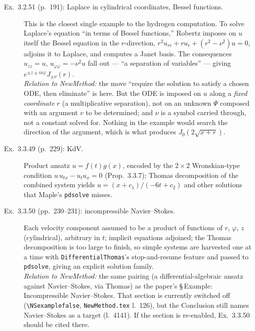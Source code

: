 \documentclass[11pt]{article}
\newcommand{\code}[1]{\texttt{#1}}
\begin{document}
\begin{description}
\item[Ex.~3.2.51 (p.~191): Laplace in cylindrical coordinates, Bessel
  functions.] This is the closest single example to the hydrogen
  computation. To solve Laplace's equation ``in terms of Bessel functions,''
  Robertz imposes on $u$ itself the Bessel equation in the $r$-direction,
  $r^2u_{rr} + r u_r + (r^2-\nu^2)u = 0$, adjoins it to Laplace, and computes a
  Janet basis. The consequences $u_{zz}=u$, $u_{\varphi\varphi}=-\nu^2u$ fall
  out --- ``a separation of variables'' --- giving $e^{\pm z \pm i\nu\varphi}
  J_{\pm\nu}(r)$. \\
  \emph{Relation to NewMethod:} the move ``require the solution to satisfy a
  chosen ODE, then eliminate'' is here. But the ODE is imposed on $u$ along a
  \emph{fixed coordinate} $r$ (a multiplicative separation), not on an
  unknown $\Psi$ composed with an argument $v$ to be determined; and $\nu$ is
  a symbol carried through, not a constant solved for. Nothing in the example
  would search the direction of the argument, which is what produces
  $J_0(2\sqrt{x+r})$.

\item[Ex.~3.3.49 (p.~229): KdV.] Product ansatz $u=f(t)g(x)$, encoded by the
  $2\times2$ Wronskian-type condition $u\,u_{tx}-u_t u_x=0$ (Prop.~3.3.7);
  Thomas decomposition of the combined system yields
  $u = (x+c_1)/(-6t+c_2)$ and other solutions that Maple's \code{pdsolve}
  misses.

\item[Ex.~3.3.50 (pp.~230--231): incompressible Navier--Stokes.] Each velocity
  component assumed to be a product of functions of $r$, $\varphi$, $z$
  (cylindrical), arbitrary in $t$; implicit equations adjoined; the Thomas
  decomposition is too large to finish, so simple systems are harvested one at
  a time with \code{DifferentialThomas}'s stop-and-resume feature and passed to
  \code{pdsolve}, giving an explicit solution family. \\
  \emph{Relation to NewMethod:} the same pairing (a differential-algebraic
  ansatz against Navier--Stokes, via Thomas) as the paper's
  \S\,Example: Incompressible Navier--Stokes. That section is currently
  switched off (\verb|\NSexamplefalse|, \code{NewMethod.tex} l.~126), but the
  Conclusion still names Navier--Stokes as a target (l.~4141). If the section
  is re-enabled, Ex.~3.3.50 should be cited there.


\end{description}
\end{document}
